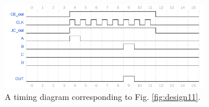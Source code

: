 \documentclass[10pt]{article}
\begin{document}
\begin{enumerate}
\begin{figure}[hb]
\centering
\includegraphics[width=0.8\textwidth]{figures/timingExample20.pdf}
\caption{\label{fig:design12} A timing diagram corresponding to Fig. \ref{fig:design11}.}
\end{figure}
\end{enumerate}
\end{document}
